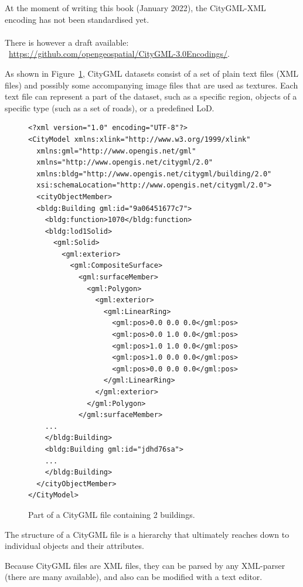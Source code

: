 \begin{kaobox-warning}[frametitle=\faExclamationTriangle\ There is no XML encoding yet for CityGML v3.0.0]
  At the moment of writing this book (January 2022), the CityGML-XML encoding has not been standardised yet.
  \\ \\
  There is however a draft available: \faExternalLink\ \url{https://github.com/opengeospatial/CityGML-3.0Encodings/}.
\end{kaobox-warning}


%

As shown in Figure~\ref{fig:citygml_file}, CityGML datasets consist of a set of plain text files (XML files) and possibly some accompanying image files that are used as textures. 
Each text file can represent a part of the dataset, such as a specific region, objects of a specific type (such as a set of roads), or a predefined LoD\@.
\begin{figure}
\begin{lstlisting}
<?xml version="1.0" encoding="UTF-8"?>
<CityModel xmlns:xlink="http://www.w3.org/1999/xlink" 
  xmlns:gml="http://www.opengis.net/gml" 
  xmlns="http://www.opengis.net/citygml/2.0" 
  xmlns:bldg="http://www.opengis.net/citygml/building/2.0"  
  xsi:schemaLocation="http://www.opengis.net/citygml/2.0">
  <cityObjectMember>
  <bldg:Building gml:id="9a06451677c7">
    <bldg:function>1070</bldg:function>
    <bldg:lod1Solid>
      <gml:Solid>
        <gml:exterior>
          <gml:CompositeSurface>
            <gml:surfaceMember>
              <gml:Polygon>
                <gml:exterior>
                  <gml:LinearRing>
                    <gml:pos>0.0 0.0 0.0</gml:pos>
                    <gml:pos>0.0 1.0 0.0</gml:pos>
                    <gml:pos>1.0 1.0 0.0</gml:pos>
                    <gml:pos>1.0 0.0 0.0</gml:pos>
                    <gml:pos>0.0 0.0 0.0</gml:pos>
                  </gml:LinearRing>
                </gml:exterior>
              </gml:Polygon>
            </gml:surfaceMember>
    ...
    </bldg:Building>
    <bldg:Building gml:id="jdhd76sa">
    ...
    </bldg:Building>
  </cityObjectMember>
</CityModel>
\end{lstlisting}
\caption{Part of a CityGML file containing 2 buildings.}%
\label{fig:citygml_file}
\end{figure}
The structure of a CityGML file is a hierarchy that ultimately reaches down to individual objects and their attributes. 

Because CityGML files are XML files, they can be parsed by any XML-parser (there are many available), and also can be modified with a text editor.

